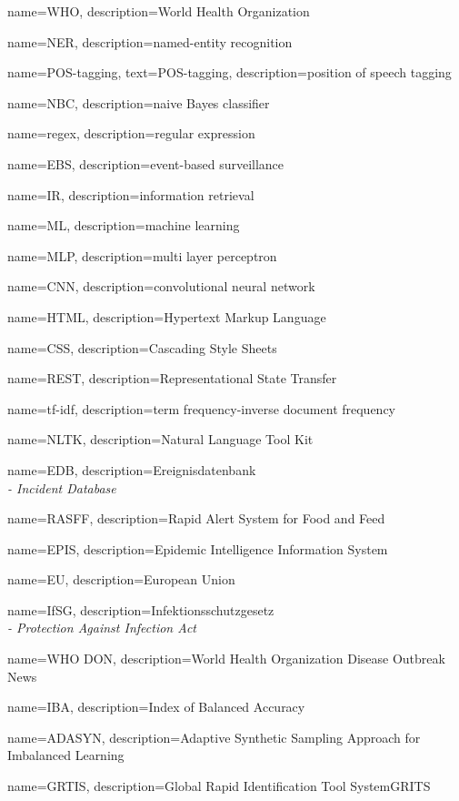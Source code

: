{
  name={WHO},
  description={World Health Organization}
}

{
  name={NER},
  description={named-entity recognition}
}

{
  name={POS-tagging},
  text={POS-tagging},
  description={position of speech tagging}
}

{
  name={NBC},
  description={naive Bayes classifier}
}

{
  name={regex},
  description={regular expression}
}

{
  name={EBS},
  description={event-based surveillance}
}

{
  name={IR},
  description={information retrieval}
}

{
  name={ML},
  description={machine learning}
}

{
  name={MLP},
  description={multi layer perceptron}
}

{
  name={CNN},
  description={convolutional neural network}
}

{
  name={HTML},
  description={Hypertext Markup Language}
}

{
  name={CSS},
  description={Cascading Style Sheets}
}

{
  name={REST},
  description={Representational State Transfer}
}

{
  name={tf-idf},
  description={term frequency-inverse document frequency}
}

{
  name={NLTK},
  description={Natural Language Tool Kit}
}

{
  name={EDB},
  description={Ereignisdatenbank\\
               \textit{- Incident Database}}
}

{
  name={RASFF},
  description={Rapid Alert System for Food and Feed}
}

{
  name={EPIS},
  description={Epidemic Intelligence Information System}
}

{
  name={EU},
  description={European Union}
}

{
  name={IfSG},
  description={Infektionsschutzgesetz\\
               \textit{- Protection Against Infection Act}}
}

{
  name={WHO DON},
  description={World Health Organization Disease Outbreak News}
}

{
  name={IBA},
  description={Index of Balanced Accuracy}
}

{
  name={ADASYN},
  description={Adaptive Synthetic Sampling Approach for Imbalanced Learning}
}

{
  name={GRTIS},
  description={Global Rapid Identification Tool SystemGRITS}
}
